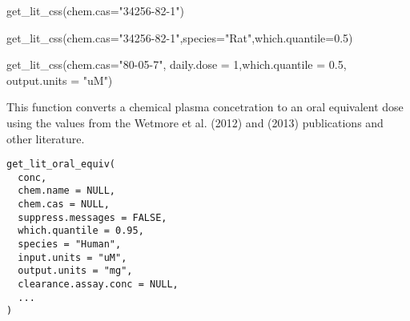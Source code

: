 \documentclass[a4paper]{book}
\begin{document}
%
\begin{Examples}
\begin{ExampleCode}
get_lit_css(chem.cas="34256-82-1")

get_lit_css(chem.cas="34256-82-1",species="Rat",which.quantile=0.5)

get_lit_css(chem.cas="80-05-7", daily.dose = 1,which.quantile = 0.5, output.units = "uM")

\end{ExampleCode}
\end{Examples}
%
\begin{Description}\relax
This function converts a chemical plasma concetration to an oral equivalent
dose using the values from the Wetmore et al. (2012) and (2013) publications
and other literature.
\end{Description}
%
\begin{Usage}
\begin{verbatim}
get_lit_oral_equiv(
  conc,
  chem.name = NULL,
  chem.cas = NULL,
  suppress.messages = FALSE,
  which.quantile = 0.95,
  species = "Human",
  input.units = "uM",
  output.units = "mg",
  clearance.assay.conc = NULL,
  ...
)
\end{verbatim}
\end{Usage}
%
\end{document}
